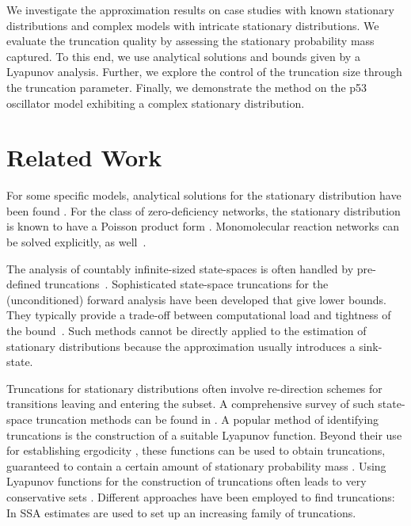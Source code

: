 We investigate the approximation results on case studies with known stationary distributions and complex models with intricate stationary distributions.
We evaluate the truncation quality by assessing the stationary probability mass captured.
To this end, we use analytical solutions and bounds given by a Lyapunov analysis.
Further, we explore the control of the truncation size through the truncation parameter.
Finally, we demonstrate the method on the p53 oscillator model exhibiting a complex stationary distribution.


\section{Related Work}\label{sec:statagg:related}
For some specific models, analytical solutions for the stationary distribution have been found \cite{melykuti2014equilibrium,kurasov2018stochastic}. For the class of zero-deficiency networks, the stationary distribution is known to have a Poisson product form \cite{anderson2010product}. Monomolecular reaction networks can be solved explicitly, as well~\cite{jahnke2007solving}.

The analysis of countably infinite-sized state-spaces is often handled by pre-defined truncations~\cite{kwiatkowska2011prism}.
Sophisticated state-space truncations for the (uncon\-ditioned) forward analysis have been developed that give lower bounds.
They typically provide a trade-off between computational load and tightness of the bound~\cite{munsky2006finite,lapin2011shave,andreychenko2011parameter,henzinger2009sliding,mikeev2013fly}.
Such methods cannot be directly applied to the estimation of stationary distributions because the approximation usually introduces a sink-state.

Truncations for stationary distributions often involve re-direction schemes for transitions leaving and entering the subset.
A comprehensive survey of such state-space truncation methods can be found in \cite{kuntz2021stationary}.
A popular method of identifying truncations is the construction of a suitable Lyapunov function.
Beyond their use for establishing ergodicity \cite{meyn1993stability,gupta2014scalable,dayar2011bounding},
these functions can be used to obtain truncations, guaranteed to contain a certain amount of stationary probability mass \cite{dayar2011bounding}.
Using Lyapunov functions for the construction of truncations often leads to very conservative sets \cite{milias2014optimization}.
Different approaches have been employed to find truncations:
In \citet{gupta2017finite} \ac{SSA} estimates are used to set up an increasing family of truncations.

